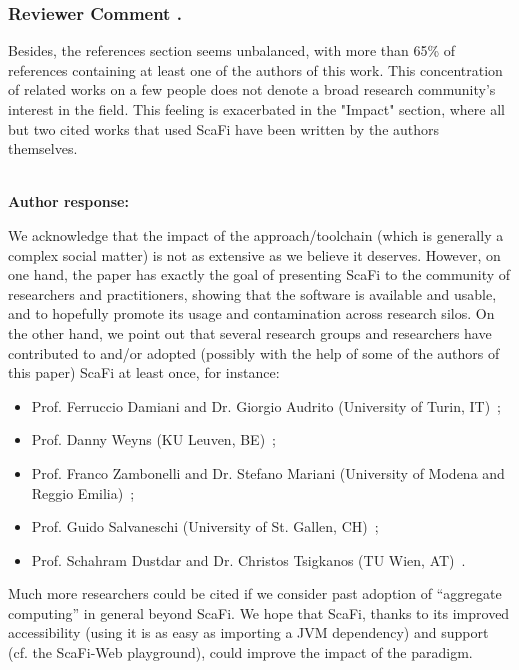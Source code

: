 \documentclass{article}
\newcounter{reviewer}
\newcounter{comment}[reviewer]
\newcommand{\commentl}[2]{
	\subsubsection*{\refstepcounter{comment}\label{#1}Reviewer Comment \arabic{reviewer}.\arabic{comment}} %
	\colorbox{gray!10}{\parbox[t]{\linewidth}{ #2 }}
}
\newcommand{\reply}[1]{	\\[2pt]
	\textbf{Author response:} 	
	#1
}
\newcommand{\meta}[1]{{\color{blue}#1}}
\begin{document}
\commentl{r1c2}{
Besides, the references section seems unbalanced, with more than 65\% of references containing at least one of the authors of this work. This concentration of related works on a few people does not denote a broad research community's interest in the field. This feeling is exacerbated in the "Impact" section, where all but two cited works that used ScaFi have been written by the authors themselves.
}
\reply{
We acknowledge that the impact of the approach/toolchain 
 (which is generally a complex social matter) 
 is not as extensive as we believe it deserves. 
%
However, on one hand, the paper has exactly the goal of
 presenting ScaFi to the community of researchers and practitioners,
 showing that the software is available and usable,
 and to hopefully promote its usage and contamination across research silos.
%
On the other hand,
 we point out that  several research groups and researchers have contributed to and/or adopted (possibly with the help of some of the authors of this paper) ScaFi at least once, for instance:
%
\begin{itemize}
\item Prof. Ferruccio Damiani and Dr. Giorgio Audrito (University of Turin, IT)~\cite{audrito2022ecoop-xc};
\item Prof. Danny Weyns (KU Leuven, BE)~\cite{casadei2022applsci};
\item Prof. Franco Zambonelli and Dr. Stefano Mariani (University of Modena and Reggio Emilia)~\cite{DBLP:journals/lmcs/PianiniCVMZ21};
\item Prof. Guido Salvaneschi (University of St. Gallen, CH)~\cite{audrito2022ecoop-xc};
\item Prof. Schahram Dustdar and Dr. Christos Tsigkanos (TU Wien, AT)~\cite{DBLP:conf/IEEEscc/CasadeiTVD19}.
\end{itemize}
%
Much more researchers could be cited if we consider past adoption of ``aggregate computing'' in general beyond ScaFi.
%
We hope that ScaFi, thanks to its improved accessibility (using it is as easy as importing a JVM dependency) and support (cf. the ScaFi-Web playground),
 could improve the impact of the paradigm.

}
\end{document}
